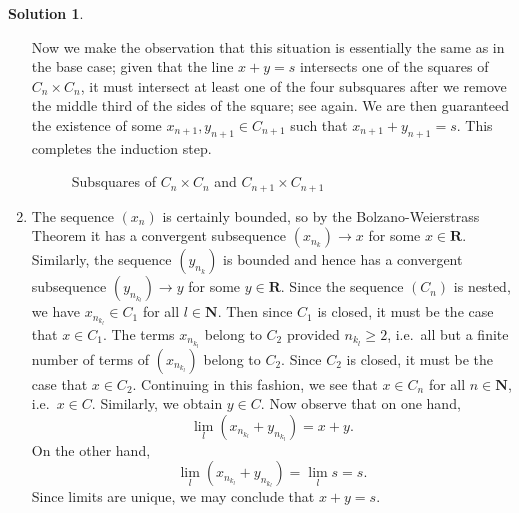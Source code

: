 \documentclass[12pt]{article}
\theoremstyle{definition}
\theoremstyle{exercise}
\theoremstyle{solution}
\newtheorem*{solution}{Solution}
\newcommand{\N}{\mathbf{N}}
\newcommand{\R}{\mathbf{R}}
\begin{document}
\begin{solution}
\begin{enumerate}
        Now we make the observation that this situation is essentially the same as in the base case; given that the line \( x + y = s \) intersects one of the squares of \( C_n \times C_n \), it must intersect at least one of the four subsquares after we remove the middle third of the sides of the square; see  again. We are then guaranteed the existence of some \( x_{n+1}, y_{n+1} \in C_{n+1} \) such that \( x_{n+1} + y_{n+1} = s \). This completes the induction step.

        \begin{figure}[h]
            \centering
            \caption{Subsquares of \( C_n \times C_n \) and \( C_{n+1} \times C_{n+1} \)} \label{fig:2}
        \end{figure}

        \item The sequence \( (x_n) \) is certainly bounded, so by the Bolzano-Weierstrass Theorem it has a convergent subsequence \( (x_{n_k}) \to x \) for some \( x \in \R \). Similarly, the sequence \( (y_{n_k}) \) is bounded and hence has a convergent subsequence \( (y_{n_{k_l}}) \to y \) for some \( y \in \R \). Since the sequence \( (C_n) \) is nested, we have \( x_{n_{k_l}} \in C_1 \) for all \( l \in \N \). Then since \( C_1 \) is closed, it must be the case that \( x \in C_1 \). The terms \( x_{n_{k_l}} \) belong to \( C_2 \) provided \( n_{k_l} \geq 2 \), i.e.\ all but a finite number of terms of \( (x_{n_{k_l}}) \) belong to \( C_2 \). Since \( C_2 \) is closed, it must be the case that \( x \in C_2 \). Continuing in this fashion, we see that \( x \in C_n \) for all \( n \in \N \), i.e.\ \( x \in C \). Similarly, we obtain \( y \in C \). Now observe that on one hand,
        \[
            \lim_l \left( x_{n_{k_l}} + y_{n_{k_l}} \right) = x + y.
        \]
        On the other hand,
        \[
            \lim_l \left( x_{n_{k_l}} + y_{n_{k_l}} \right) = \lim_l s = s.
        \]
        Since limits are unique, we may conclude that \( x + y = s \).
    \end{enumerate}
\end{solution}
\end{document}
